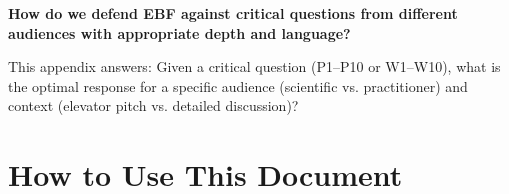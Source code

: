 
\begin{tcolorbox}[colback=red!5!white, colframe=red!75!black,
    title=Fundamental Question]
\textbf{How do we defend EBF against critical questions from different audiences with appropriate depth and language?}

This appendix answers: Given a critical question (P1--P10 or W1--W10), what is the optimal response for a specific audience (scientific vs. practitioner) and context (elevator pitch vs. detailed discussion)?
\end{tcolorbox}


\begin{abstract}
This appendix provides ready-to-use responses for the 20 critical questions
identified in Appendix DA. Each question has 6 response variants: 3 lengths
(short/medium/long) $\times$ 2 audiences (scientific/practitioner). Use the
appropriate variant based on context, time available, and audience expertise.
All scientific (LANG) versions include proper citations to the behavioral economics
literature (Kahneman, Tversky, Fehr, Thaler, Camerer, et al.).
\end{abstract}

\section{How to Use This Document}
\label{sec:da2-howto}

